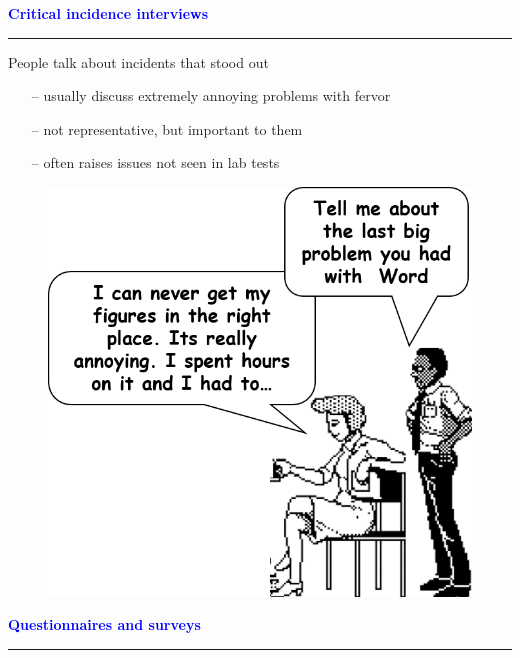 \documentclass[pdf]{beamer}
\begin{document}
{%
{
\begin{frame}
	\vspace{8mm}
	\textcolor{Blue}{\textbf{\large{Critical incidence interviews}}}
    \textcolor{red}{\rule{10cm}{1mm}}
    
    People talk about incidents that stood out
    \begin{itemize}
      \item[\textcolor{black}{--}] usually discuss extremely annoying problems with fervor
      \item[\textcolor{black}{--}] not representative, but important to them
      \item[\textcolor{black}{--}] often raises issues not seen in lab tests
    \end{itemize}
    \begin{figure}[b]
    	\includegraphics[scale = 0.4, right]{24_Imagine.png}
    \end{figure}
\end{frame}



{
\begin{frame}
	\vspace{8mm}
	\textcolor{Blue}{\textbf{\large{Questionnaires and surveys}}}
    \textcolor{red}{\rule{10cm}{1mm}}


\end{frame}}}}
\end{document}
